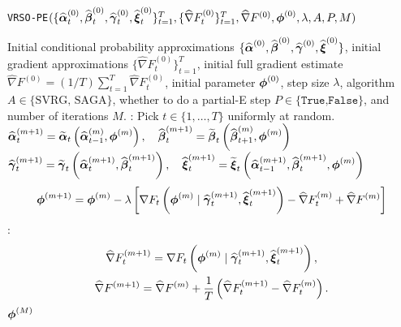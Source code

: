 \begin{algorithm}
\caption{\texttt{VRSO-PE}$(\{\widehat {\boldsymbol{\alpha}}_t^{(0)}, \widehat {\boldsymbol{\beta}}_t^{(0)}, \widehat {\boldsymbol{\gamma}}_t^{(0)}, \widehat {\boldsymbol{\xi}}_t^{(0)}\}_{t=1}^T,\{\widehat \nabla F_t^{(0)}\}_{t=1}^T, \widehat \nabla F^{(0)},\boldsymbol{\phi}^{(0)},\lambda,A,P,M)$}\label{alg:VRSO-PE}
\begin{algorithmic}[1]
\Require Initial conditional probability approximations $\{\widehat {\boldsymbol{\alpha}}^{(0)}, \widehat {\boldsymbol{\beta}}^{(0)}, \widehat {\boldsymbol{\gamma}}^{(0)}, \widehat {\boldsymbol{\xi}}^{(0)}\}$, initial gradient approximations $\{\widehat \nabla F_t^{(0)}\}_{t=1}^T$, initial full gradient estimate $\widehat \nabla F^{(0)} = (1/T) \sum_{t=1}^T \widehat \nabla F_{t}^{(0)}$, initial parameter $\boldsymbol{\phi}^{(0)}$, step size $\lambda$, algorithm $A \in \{\text{SVRG, SAGA}\}$, whether to do a partial-E step $P \in \{\texttt{True,False}\}$, and number of iterations $M$.
%
\vspace{5pt}
%
:
    \State Pick $t \in \{1,\ldots,T\}$ uniformly at random.
     
    \State $\widehat {\boldsymbol{\alpha}}_{t}^{(m+1)} = \widetilde {\boldsymbol{\alpha}}_{t}\left(\widehat {\boldsymbol{\alpha}}_{t-1}^{(m)},\boldsymbol{\phi}^{(m)}\right), \quad \widehat {\boldsymbol{\beta}}_{t}^{(m+1)} = \widetilde {\boldsymbol{\beta}}_{t}\left(\widehat {\boldsymbol{\beta}}_{t+1}^{(m)},\boldsymbol{\phi}^{(m)}\right)$ 
    \vspace{5pt}
    \State $\widehat {\boldsymbol{\gamma}}_{t}^{(m+1)} = \widetilde {\boldsymbol{\gamma}}_{t}\left(\widehat {\boldsymbol{\alpha}}_{t}^{(m+1)},\widehat {\boldsymbol{\beta}}_{t}^{(m+1)}\right), 
    \quad \widehat {\boldsymbol{\xi}}_{t}^{(m+1)} = \widetilde {\boldsymbol{\xi}}_{t}\left(\widehat {\boldsymbol{\alpha}}_{t-1}^{(m+1)},\widehat {\boldsymbol{\beta}}_{t}^{(m+1)},\boldsymbol{\phi}^{(m)}\right)$
    \EndIf
    \State {}
    \begin{gather}
        \boldsymbol{\phi}^{(m+1)} = \boldsymbol{\phi}^{(m)} - \lambda \left[\nabla F_{t}\left(\boldsymbol{\phi}^{(m)} \mid \widehat {\boldsymbol{\gamma}}_{t}^{(m+1)}, \widehat {\boldsymbol{\xi}}_{t}^{(m+1)}\right) - \widehat \nabla F^{(m)}_{t} + \widehat \nabla F^{(m)} \right]
    \end{gather}
    :
        \begin{gather}
            \widehat \nabla F_{t}^{(m+1)} = \nabla F_{t}\left(\boldsymbol{\phi}^{(m)} \mid \widehat {\boldsymbol{\gamma}}_{t}^{(m+1)}, \widehat {\boldsymbol{\xi}}_{t}^{(m+1)}\right), \\
            \widehat \nabla F^{(m+1)} = \widehat \nabla F^{(m)} + \frac{1}{T} \left( \widehat \nabla F_{t}^{(m+1)} - \widehat \nabla F_{t}^{(m)}\right).
        \end{gather}
    \EndIf
\EndFor
\State \Return $\boldsymbol{\phi}^{(M)}$
\end{algorithmic}
\end{algorithm}

